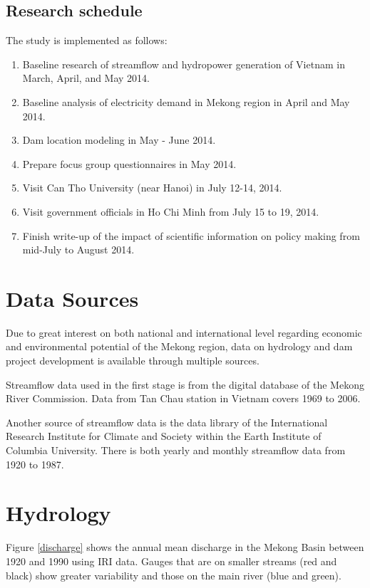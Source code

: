 \documentclass[11pt,english]{article}
\theoremstyle{plain} \newtheorem{claim}{Claim}
\theoremstyle{plain} \newtheorem{prop}{Proposition}
\theoremstyle{plain} \newtheorem{hypo}{Hypothesis}
\begin{document}
\subsection{Research schedule}
The study is implemented as follows:
\begin{enumerate}
	\item Baseline research of streamflow and hydropower generation of Vietnam in March, April, and May 2014.
	\item Baseline analysis of electricity demand in Mekong region in April and May 2014.
	\item Dam location modeling in May - June 2014.
	\item Prepare focus group questionnaires in May 2014.
	\item Visit Can Tho University (near Hanoi) in July 12-14, 2014.
	\item Visit government officials in Ho Chi Minh from July 15 to 19, 2014.
	\item Finish write-up of the impact of scientific information on policy making from mid-July to August 2014. 

\end{enumerate}

\section{Data Sources}

Due to great interest on both national and international level regarding economic and environmental potential of the Mekong region, data on hydrology and dam project development is available through multiple sources. 

Streamflow data used in the first stage is from the digital database of the Mekong River Commission. Data from Tan Chau station in Vietnam covers 1969 to 2006. 

Another source of streamflow data is the data library of the International Research Institute for Climate and Society within the Earth Institute of Columbia University. There is both yearly and monthly streamflow data from 1920 to 1987. 

\section{Hydrology}

Figure \ref{discharge} shows the annual mean discharge in the Mekong Basin between 1920 and 1990 using IRI data. Gauges that are on smaller streams (red and black) show greater variability and those on the main river (blue and green).
\end{document}
